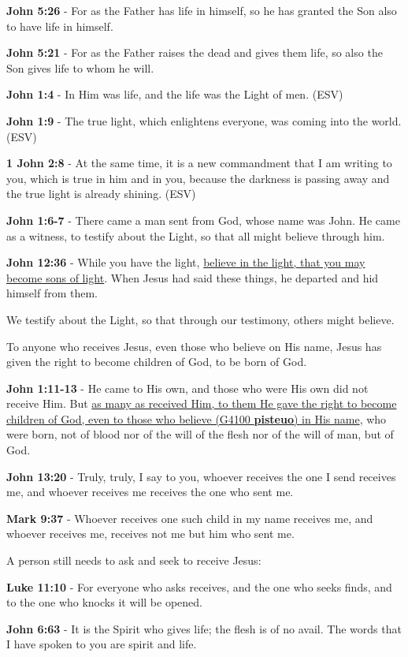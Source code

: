 \documentclass[11pt]{article}
\begin{document}
\textbf{John 5:26} - For as the Father has life in himself, so he has granted the Son also to have life in himself.

\textbf{John 5:21} - For as the Father raises the dead and gives them life, so also the Son gives life to whom he will.

\textbf{John 1:4} - In Him was life, and the life was the Light of men. (ESV)

\textbf{John 1:9} - The true light, which enlightens everyone, was coming into the world. (ESV)

\textbf{1 John 2:8} -  At the same time, it is a new commandment that I am writing to you, which is true in him and in you, because the darkness is passing away and the true light is already shining.  (ESV)

\textbf{John 1:6-7} - There came a man sent from God, whose name was John. He came as a witness, to testify about the Light, so that all might believe through him.

\textbf{John 12:36} - While you have the light, \uline{believe in the light, that you may become sons of light}. When Jesus had said these things, he departed and hid himself from them.

We testify about the Light, so that through our testimony, others might believe.

To anyone who receives Jesus, even those who believe on His name, Jesus has given the right to become children of God, to be born of God.

\textbf{John 1:11-13} - He came to His own, and those who were His own did not receive Him. But \uline{as many as received Him, to them He gave the right to become children of God, even to those who believe (G4100 \textbf{pisteuo}) in His name}, who were born, not of blood nor of the will of the flesh nor of the will of man, but of God.

\textbf{John 13:20} - Truly, truly, I say to you, whoever receives the one I send receives me, and whoever receives me receives the one who sent me.

\textbf{Mark 9:37} - Whoever receives one such child in my name receives me, and whoever receives me, receives not me but him who sent me.

A person still needs to ask and seek to receive Jesus:

\textbf{Luke 11:10} - For everyone who asks receives, and the one who seeks finds, and to the one who knocks it will be opened.

\textbf{John 6:63} - It is the Spirit who gives life; the flesh is of no avail. The words that I have spoken to you are spirit and life.
\end{document}
